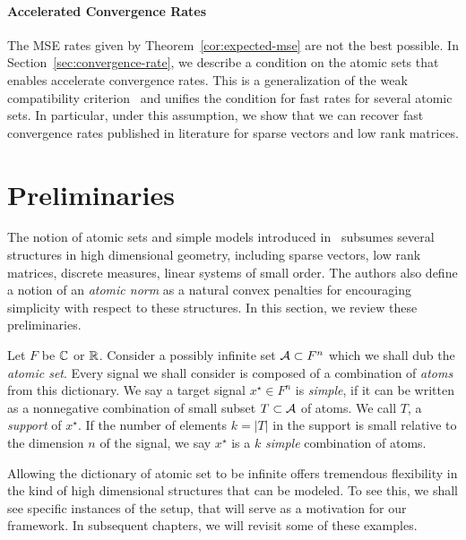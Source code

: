 \paragraph*{Accelerated Convergence Rates} The MSE rates given by
Theorem~\ref{cor:expected-mse} are not the best possible. In
Section~\ref{sec:convergence-rate}, we describe a condition on the atomic sets
that enables accelerate convergence rates. This is a generalization of the weak
compatibility criterion~\cite{degeer} and unifies the condition for fast rates
for several atomic sets. In particular, under this assumption, we show that we
can recover fast convergence rates published in literature for sparse vectors
and low rank matrices.


\section{Preliminaries}
\label{sec:ast:preliminaries}

The notion of atomic sets and simple models introduced in~\cite{crpw} subsumes
several structures in high dimensional geometry, including sparse
vectors, low rank matrices, discrete measures, linear systems of small order.
The authors also define a notion of an \emph{atomic norm} as a natural convex
penalties for encouraging simplicity with respect to these structures. In this
section, we review these preliminaries.

Let $F$ be $\mathbb{C}$ or $\mathbb{R}$. Consider a possibly infinite set $\mathcal{A} \subset F^n$ which
we shall dub the \emph{atomic set}. Every signal we shall consider is composed
of a combination of \emph{atoms} from this dictionary. We say a target signal
$x^\star \in F^n$ is \emph{simple}, if it can be written as a nonnegative
combination of small subset $T \subset \mathcal{A}$ of atoms. We call $T$, a
\emph{support} of $x^\star$. If the number of elements $k = |T|$ in the support
is small relative to the dimension $n$ of the signal, we say $x^\star$ is a $k$
\emph{simple} combination of atoms.

Allowing the dictionary of atomic set to be infinite offers tremendous
flexibility in the kind of high dimensional structures that can be modeled. To
see this, we shall see specific instances of the setup, that will serve as a
motivation for our framework. In subsequent chapters, we will revisit some of these examples.


